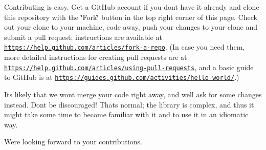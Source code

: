 Contributing is easy. Get a Git\+Hub account if you don\textquotesingle{}t have it already and clone this repository with the \char`\"{}\+Fork\char`\"{} button in the top right corner of this page. Check out your clone to your machine, code away, push your changes to your clone and submit a pull request; instructions are available at \href{https://help.github.com/articles/fork-a-repo}{\tt https\+://help.\+github.\+com/articles/fork-\/a-\/repo}. (In case you need them, more detailed instructions for creating pull requests are at \href{https://help.github.com/articles/using-pull-requests}{\tt https\+://help.\+github.\+com/articles/using-\/pull-\/requests}, and a basic guide to Git\+Hub is at \href{https://guides.github.com/activities/hello-world/}{\tt https\+://guides.\+github.\+com/activities/hello-\/world/}.)

It\textquotesingle{}s likely that we won\textquotesingle{}t merge your code right away, and we\textquotesingle{}ll ask for some changes instead. Don\textquotesingle{}t be discouraged! That\textquotesingle{}s normal; the library is complex, and thus it might take some time to become familiar with it and to use it in an idiomatic way.

We\textquotesingle{}re looking forward to your contributions. 